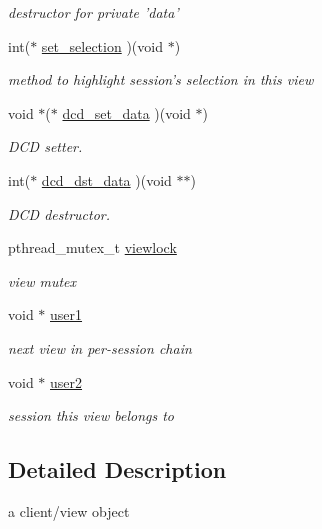\begin{CompactItemize}
\begin{CompactList}\small\item\em destructor for private 'data' \item\end{CompactList}\item 
\hypertarget{struct__client__funs_o5}{
int($\ast$ \hyperlink{struct__client__funs_o5}{set\_\-selection} )(void $\ast$)}
\label{struct__client__funs_o5}

\begin{CompactList}\small\item\em method to highlight session's selection in this view \item\end{CompactList}\item 
\hypertarget{struct__client__funs_o6}{
void $\ast$($\ast$ \hyperlink{struct__client__funs_o6}{dcd\_\-set\_\-data} )(void $\ast$)}
\label{struct__client__funs_o6}

\begin{CompactList}\small\item\em DCD setter. \item\end{CompactList}\item 
\hypertarget{struct__client__funs_o7}{
int($\ast$ \hyperlink{struct__client__funs_o7}{dcd\_\-dst\_\-data} )(void $\ast$$\ast$)}
\label{struct__client__funs_o7}

\begin{CompactList}\small\item\em DCD destructor. \item\end{CompactList}\item 
\hypertarget{struct__client__funs_o8}{
pthread\_\-mutex\_\-t \hyperlink{struct__client__funs_o8}{viewlock}}
\label{struct__client__funs_o8}

\begin{CompactList}\small\item\em view mutex \item\end{CompactList}\item 
\hypertarget{struct__client__funs_o9}{
void $\ast$ \hyperlink{struct__client__funs_o9}{user1}}
\label{struct__client__funs_o9}

\begin{CompactList}\small\item\em next view in per-session chain \item\end{CompactList}\item 
\hypertarget{struct__client__funs_o10}{
void $\ast$ \hyperlink{struct__client__funs_o10}{user2}}
\label{struct__client__funs_o10}

\begin{CompactList}\small\item\em session this view belongs to \item\end{CompactList}\end{CompactItemize}


\subsection{Detailed Description}
a client/view object 


